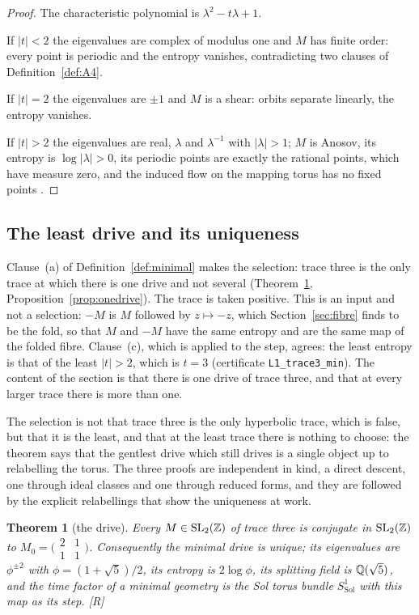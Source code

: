 \documentclass[11pt,a4paper]{article}
\theoremstyle{plain}
\newtheorem{theorem}{Theorem}[section]
\theoremstyle{definition}
\theoremstyle{remark}
\newcommand{\Sol}{\mathrm{Sol}}
\newcommand{\rigR}{[\textup{R}]}
\begin{document}
\begin{proof}
The characteristic polynomial is $\lambda^{2}-t\lambda+1$.

If $\lvert t\rvert<2$ the eigenvalues are complex of modulus one and $M$ has finite order: every point is periodic and the entropy vanishes, contradicting two clauses of Definition~\ref{def:A4}.

If $\lvert t\rvert=2$ the eigenvalues are $\pm1$ and $M$ is a shear: orbits separate linearly, the entropy vanishes.

If $\lvert t\rvert>2$ the eigenvalues are real, $\lambda$ and $\lambda^{-1}$ with $\lvert\lambda\rvert>1$; $M$ is Anosov, its entropy is $\log\lvert\lambda\rvert>0$, its periodic points are exactly the rational points, which have measure zero, and the induced flow on the mapping torus has no fixed points \cite{KatokHasselblatt}.
\end{proof}

\subsection{The least drive and its uniqueness}

Clause~(a) of Definition~\ref{def:minimal} makes the selection: trace three is the only trace at which there is one drive and not several (Theorem~\ref{thm:drive}, Proposition~\ref{prop:onedrive}). The trace is taken positive. This is an input and not a selection: $-M$ is $M$ followed by $z\mapsto-z$, which Section~\ref{sec:fibre} finds to be the fold, so that $M$ and $-M$ have the same entropy and are the same map of the folded fibre. Clause~(c), which is applied to the step, agrees: the least entropy is that of the least $\lvert t\rvert>2$, which is $t=3$ (certificate \texttt{L1\_trace3\_min}). The content of the section is that there is one drive of trace three, and that at every larger trace there is more than one.

The selection is not that trace three is the only hyperbolic trace, which is false, but that it is the least, and that at the least trace there is nothing to choose: the theorem says that the gentlest drive which still drives is a single object up to relabelling the torus. The three proofs are independent in kind, a direct descent, one through ideal classes and one through reduced forms, and they are followed by the explicit relabellings that show the uniqueness at work.

\begin{theorem}[the drive]\label{thm:drive}
Every $M\in\mathrm{SL}_{2}(\mathbb{Z})$ of trace three is conjugate in $\mathrm{SL}_{2}(\mathbb{Z})$ to $M_{0}=\bigl(\begin{smallmatrix}2&1\\1&1\end{smallmatrix}\bigr)$. Consequently the minimal drive is unique; its eigenvalues are $\phi^{\pm2}$ with $\phi=(1+\sqrt5)/2$, its entropy is $2\log\phi$, its splitting field is $\mathbb{Q}(\sqrt5)$, and the time factor of a minimal geometry is the Sol torus bundle $S^{1}_{\Sol}$ with this map as its step. \rigR
\end{theorem}
\end{document}
